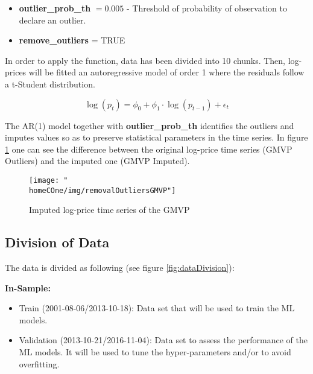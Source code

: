 \documentclass[a4paper]{report}
\newcommand{\homeCOne}{../../Chapter 1 - Metalabeling/Draft}
\begin{document}
\begin{itemize}
	\item \textbf{outlier\_prob\_th} $= 0.005$ - Threshold of 
	probability of observation to declare an outlier.
	\item \textbf{remove\_outliers} = TRUE
\end{itemize}

In order to apply the function, data has been divided into 10 chunks. 
Then, log-prices will be fitted an autoregressive model of order 1 
where the residuals follow a t-Student distribution.


\begin{equation*}
	\log (p_t) = \phi_0 + \phi_1 \cdot \log (p_{t-1}) + \epsilon_t
\end{equation*}

The AR(1) model together with \textbf{outlier\_prob\_th} identifies 
the outliers  and imputes values so as to preserve statistical 
parameters in the time series. In figure \ref{fig:removalOutlierGMVP} 
one can see the difference between the original log-price time series 
(GMVP Outliers) and the imputed one (GMVP Imputed).

\begin{figure}[htbp]
	\centering
	\texttt{[image: "\\homeCOne/img/removalOutliersGMVP"]}
	\caption{Imputed log-price time series of the GMVP}
	\label{fig:removalOutlierGMVP}
\end{figure}

\subsection{Division of Data}
The data is divided as following (see figure \ref{fig:dataDivision}):

\vspace{.1cm}

\textbf{In-Sample:}
\begin{itemize}
	\item Train (2001-08-06/2013-10-18): Data set that will be used to 
	train the ML models.
	
	\item Validation (2013-10-21/2016-11-04): Data set to assess the 
	performance of the ML models. It will be used to tune the 
	hyper-parameters and/or to avoid overfitting.
\end{itemize}
\end{document}
